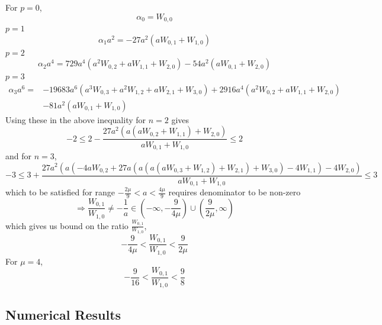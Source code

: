 ﻿\documentclass[12pt,a4paper]{article}
\begin{document}
For $p=0$,
$$
\alpha_{0}=W_{0,0}
$$
$p=1$
$$
\alpha_{1}a^{2}=-27 a^2 (a W_{0,1}+W_{1,0})
$$
$p=2$
$$
\alpha_{2}a^{4}=729 a^4 \left(a^2 W_{0,2}+a W_{1,1}+W_{2,0}\right)-54 a^2 (a W_{0,1}+W_{2,0})
$$
$p=3$
$$
\begin{aligned}
\alpha_{3}a^{6}=&-19683 a^6 \left(a^3 W_{0,3}+a^2 W_{1,2}+a W_{2,1}+W_{3,0}\right)+2916 a^4 \left(a^2 W_{0,2}+a W_{1,1}+W_{2,0}\right)\\
&-81 a^2 (a W_{0,1}+W_{1,0})
\end{aligned}
$$
Using these in the above inequality for $n=2$ gives
$$
-2 \leq 2-\frac{27 a^{2}\left(a\left(a W_{0,2}+W_{1,1}\right)+W_{2,0}\right)}{a W_{0,1}+W_{1,0}} \leq 2
$$
and for $n=3$,
$$
-3 \leq 3+\frac{27 a^{2}\left(a\left(-4 a W_{0,2}+27 a\left(a\left(a\left(a W_{0,3}+W_{1,2}\right)+W_{2,1}\right)+W_{3,0}\right)-4 W_{1,1}\right)-4 W_{2,0}\right)}{a W_{0,1}+W_{1,0}} \leq 3
$$
which to be satisfied for range $-\frac{2 \mu}{9}<a<\frac{4 \mu}{9}$ requires denominator to be non-zero 
$$
\Rightarrow \frac{W_{0,1}}{W_{1,0}} \neq -\frac{1}{a} \in \left(-\infty,-\frac{9}{4 \mu} \right) \cup\left(\frac{9}{2 \mu}, \infty \right)
$$
which gives us bound on the ratio $\frac{W_{0,1}}{W_{1,0}}$,
$$
-\frac{9}{4 \mu}<\frac{W_{0,1}}{W_{1,0}}<\frac{9}{2 \mu}
$$
For $\mu=4$,
$$
-\frac{9}{16}<\frac{W_{0,1}}{W_{1,0}}<\frac{9}{8}
$$

















\subsection{Numerical Results}
\end{document}
